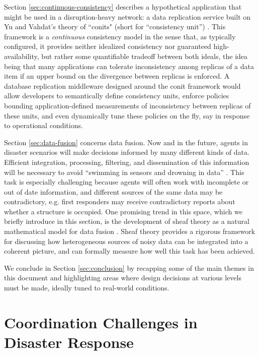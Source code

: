 \documentclass[]             %
{NASA}                       %
\theoremstyle{definition}
\begin{document}
Section \ref{sec:continuous-consistency} describes a hypothetical
application that might be used in a disruption-heavy network: a data
replication service built on Yu and Vahdat's theory of ``conits" \cite{2002tact}
(short for ``consistency unit'') . This framework is a
\emph{continuous} consistency model in the sense that, as typically
configured, it provides neither idealized consistency nor guaranteed
high-availability, but rather some quantifiable tradeoff between both
ideals, the idea being that many applications can tolerate
inconsistency among replicas of a data item if an upper bound on the
divergence between replicas is enforced. A database replication
middleware designed around the conit framework would allow developers
to semantically define consistency units, enforce policies bounding
application-defined measurements of inconsistency between replicas of
these units, and even dynamically tune these policies on the fly, say
in response to operational conditions.

Section \ref{sec:data-fusion} concerns data fusion. Now and in the
future, agents in disaster scenarios will make decisions informed by
many different kinds of data. Efficient integration, processing, filtering, and dissemination
of this information will be necessary to avoid ``swimming in sensors and
drowning in data'' \cite{2010:magnuson}.  This task is especially
challenging because agents will often work with incomplete or out of
date information, and different sources of the same data may be
contradictory, e.g. first responders may receive contradictory reports
about whether a structure is occupied. One promising trend in this
space, which we briefly introduce in this section, is the development
of sheaf theory as a natural mathematical model for data fusion
\cite{2017robinsonCanonical}. Sheaf theory provides a rigorous
framework for discussing how heterogeneous sources of noisy data can
be integrated into a coherent picture, and can formally measure how
well this task has been achieved.

We conclude in Section \ref{sec:conclusion} by recapping some of the
main themes in this document and highlighting areas where design
decisions at various levels must be made, ideally tuned to real-world conditions.

\newpage

\section{Coordination Challenges in Disaster
Response}\label{coordination-challenges-in-disaster-response}
\end{document}
